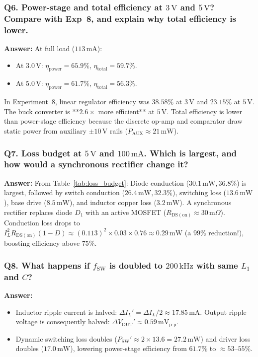 \documentclass[11pt,a4paper]{article}
\begin{document}
\subsubsection*{Q6. Power-stage and total efficiency at $3\,\mathrm{V}$ and $5\,\mathrm{V}$? Compare with Exp~8, and explain why total efficiency is lower.}
\textbf{Answer:} At full load ($113\,\mathrm{mA}$):
\begin{itemize}
    \item At $3.0\,\mathrm{V}$: $\eta_{\mathrm{power}} = \mathbf{65.9\%}$, $\eta_{\mathrm{total}} = \mathbf{59.7\%}$.
    \item At $5.0\,\mathrm{V}$: $\eta_{\mathrm{power}} = \mathbf{61.7\%}$, $\eta_{\mathrm{total}} = \mathbf{56.3\%}$.
\end{itemize}
In Experiment~8, linear regulator efficiency was $38.58\%$ at $3\,\mathrm{V}$ and $23.15\%$ at $5\,\mathrm{V}$. The buck converter is **$2.6\times$ more efficient** at $5\,\mathrm{V}$. Total efficiency is lower than power-stage efficiency because the discrete op-amp and comparator draw static power from auxiliary $\pm 10\,\mathrm{V}$ rails ($P_{\mathrm{AUX}} \approx 21\,\mathrm{mW}$).

\subsubsection*{Q7. Loss budget at $5\,\mathrm{V}$ and $100\,\mathrm{mA}$. Which is largest, and how would a synchronous rectifier change it?}
\textbf{Answer:} From Table~\ref{tab:loss_budget}: Diode conduction ($30.1\,\mathrm{mW}, 36.8\%$) is largest, followed by switch conduction ($26.4\,\mathrm{mW}, 32.3\%$), switching loss ($13.6\,\mathrm{mW}$), base drive ($8.5\,\mathrm{mW}$), and inductor copper loss ($3.2\,\mathrm{mW}$).
A synchronous rectifier replaces diode $D_1$ with an active MOSFET ($R_{\mathrm{DS(on)}} \approx 30\,\mathrm{m}\Omega$). Conduction loss drops to $I_L^2 R_{\mathrm{DS(on)}} (1 - D) \approx (0.113)^2 \times 0.03 \times 0.76 \approx \mathbf{0.29\,\mathrm{mW}}$ (a $99\%$ reduction!), boosting efficiency above $75\%$.

\subsubsection*{Q8. What happens if $f_{\mathrm{SW}}$ is doubled to $200\,\mathrm{kHz}$ with same $L_1$ and $C$?}
\textbf{Answer:} 
\begin{itemize}
    \item Inductor ripple current is halved: $\Delta I_L' = \Delta I_L / 2 \approx 17.85\,\mathrm{mA}$. Output ripple voltage is consequently halved: $\Delta V_{\mathrm{OUT}}' \approx \mathbf{0.59\,\mathrm{mV}_{\mathrm{p\text{-}p}}}$.
    \item Dynamic switching loss doubles ($P_{\mathrm{SW}}' \approx 2 \times 13.6 = 27.2\,\mathrm{mW}$) and driver loss doubles ($17.0\,\mathrm{mW}$), lowering power-stage efficiency from $61.7\%$ to $\approx 53\text{--}55\%$.
\end{itemize}
\end{document}

